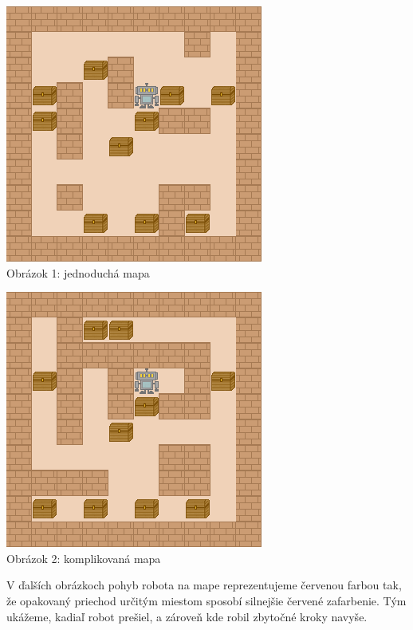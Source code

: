 \documentclass[10pt]{paper}
\begin{document}
\begin{center}
\begin{paracol}{2}
\setlength{\columnseprule}{0pt}
\setlength{\columnsep}{0em}
\begin{leftcolumn}
	\includegraphics[scale=0.5]{simple_map.png} \\
	Obrázok 1: jednoduchá mapa
\end{leftcolumn}

\begin{rightcolumn}
	\includegraphics[scale=0.5]{complicated_map.png} \\
	Obrázok 2: komplikovaná mapa
\end{rightcolumn}
\end{paracol}
\end{center}

V ďalších obrázkoch pohyb robota na mape reprezentujeme červenou farbou tak, že opakovaný priechod určitým miestom sposobí silnejšie červené zafarbenie. Tým ukážeme, kadiaľ robot prešiel, a zároveň kde robil zbytočné kroky navyše.
\end{document}
